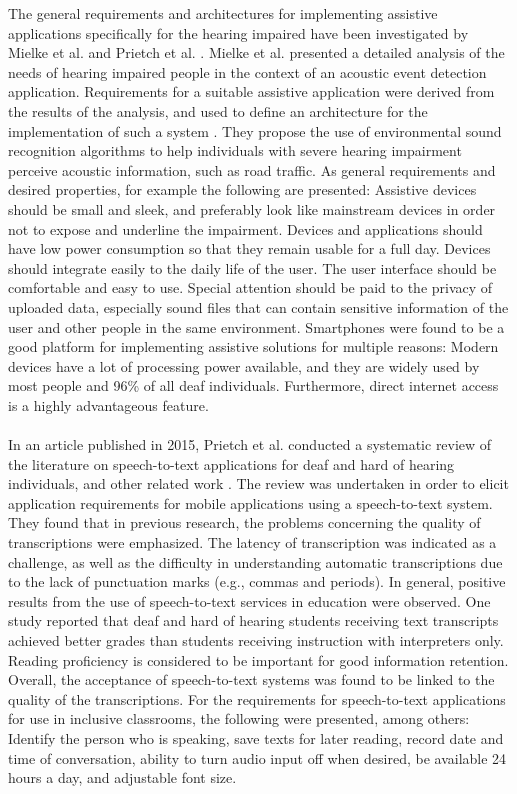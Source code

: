 \documentclass[english, 12pt, a4paper, pdftex, elec, utf8]{aaltothesis}
\begin{document}
The general requirements and architectures for implementing assistive applications specifically for the hearing impaired have been investigated by Mielke et al. \cite{mielke2013assistive} and Prietch et al. \cite{prietch2015application}. Mielke et al. presented a detailed analysis of the needs of hearing impaired people in the context of an acoustic event detection application. Requirements for a suitable assistive application were derived from the results of the analysis, and used to define an architecture for the implementation of such a system \cite{mielke2013assistive}. They propose the use of environmental sound recognition algorithms to help individuals with severe hearing impairment perceive acoustic information, such as road traffic. As general requirements and desired properties, for example the following are presented: Assistive devices should be small and sleek, and preferably look like mainstream devices in order not to expose and underline the impairment. Devices and applications should have low power consumption so that they remain usable for a full day. Devices should integrate easily to the daily life of the user. The user interface should be comfortable and easy to use. Special attention should be paid to the privacy of uploaded data, especially sound files that can contain sensitive information of the user and other people in the same environment. Smartphones were found to be a good platform for implementing assistive solutions for multiple reasons: Modern devices have a lot of processing power available, and they are widely used by most people and 96\% of all deaf individuals. Furthermore, direct internet access is a highly advantageous feature. \\\\
In an article published in 2015, Prietch et al. conducted a systematic review of the literature on speech-to-text applications for deaf and hard of hearing individuals, and other related work \cite{prietch2015application}. The review was undertaken in order to elicit application requirements for mobile applications using a speech-to-text system. They found that in previous research, the problems concerning the quality of transcriptions were emphasized. The latency of transcription was indicated as a challenge, as well as the difficulty in understanding automatic transcriptions due to the lack of punctuation marks (e.g., commas and periods). In general, positive results from the use of speech-to-text services in education were observed. One study reported that deaf and hard of hearing students receiving text transcripts achieved better grades than students receiving instruction with interpreters only. Reading proficiency is considered to be important for good information retention. Overall, the acceptance of speech-to-text systems was found to be linked to the quality of the transcriptions. For the requirements for speech-to-text applications for use in inclusive classrooms, the following were presented, among others: Identify the person who is speaking, save texts for later reading, record date and time of conversation, ability to turn audio input off when desired, be available 24 hours a day, and adjustable font size.
\end{document}
